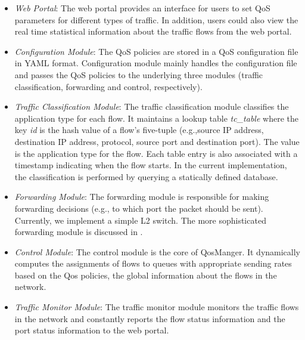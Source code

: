 \begin{itemize}
  \item \emph{Web Portal}: The web portal provides an interface for users to set QoS parameters for
    different types of traffic. In addition, users could also view the real time statistical information
    about the traffic flows from the web portal.
  \item \emph{Configuration Module}: The QoS policies are stored in a QoS configuration file in YAML
    format. Configuration module mainly handles the configuration file and passes the QoS policies
    to the underlying three modules (traffic classification, forwarding and control, respectively).
  \item \emph{Traffic Classification Module}: The traffic classification module classifies the application
    type for each flow. It maintains a lookup table \emph{tc\_table} where the key \emph{id} is the hash value of a
    flow's five-tuple (e.g.,source IP address, destination IP address, protocol, source port and destination port).
    The value is the application type for the flow. Each table entry is also associated with a timestamp indicating
    when the flow starts. In the current implementation, the classification is performed by querying a statically
    defined database.
  \item \emph{Forwarding Module}: The forwarding module is responsible for making forwarding decisions (e.g.,
    to which port the packet should be sent). Currently, we implement a simple L2 switch. The more sophisticated
    forwarding module is discussed in .
  \item \emph{Control Module}: The control module is the core of QosManger. It dynamically computes the
    assignments of flows to queues with appropriate sending rates based on the Qos policies, the global
    information about the flows in the network.
  \item \emph{Traffic Monitor Module}: The traffic monitor module monitors the traffic flows in the network
    and constantly reports the flow status information and the port status information to the web portal.
\end{itemize}

